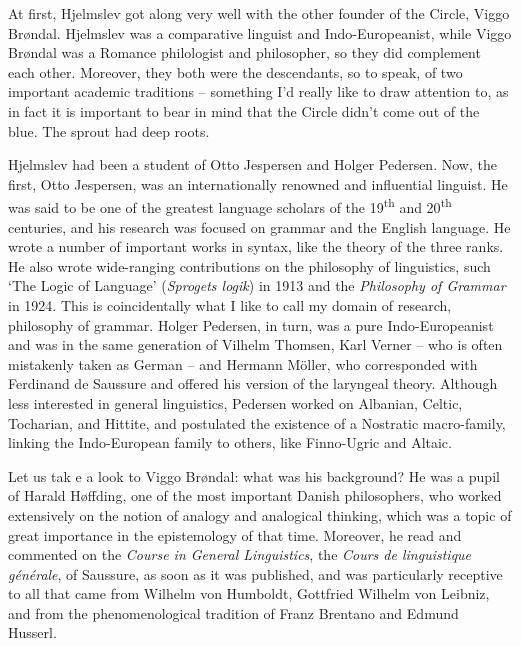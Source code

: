 \begin{styleStandard}
At first, Hjelmslev got along very well with the other founder of the Circle, Viggo Brøndal. Hjelmslev was a comparative linguist and Indo-Europeanist, while Viggo Brøndal was a Romance philologist and philosopher, so they did complement each other. Moreover, they both were the descendants, so to speak, of two important academic traditions – something I’d really like to draw attention to, as in fact it is important to bear in mind that the Circle didn’t come out of the blue. The sprout had deep roots. 
\end{styleStandard}

\begin{styleStandard}
Hjelmslev had been a student of Otto Jespersen and Holger Pedersen. Now, the first, Otto Jespersen, was an internationally renowned and influential linguist. He was said to be one of the greatest language scholars of the 19\textsuperscript{th} and 20\textsuperscript{th} centuries, and his research was focused on grammar and the English language. He wrote a number of important works in syntax, like the theory of the three ranks. He also wrote wide-ranging contributions on the philosophy of linguistics, such ‘The Logic of Language’ (\textit{Sprogets logik}) in 1913 and the \textit{Philosophy of Grammar} in 1924. This is coincidentally what I like to call my domain of research, philosophy of grammar. Holger Pedersen, in turn, was a pure Indo-Europeanist and was in the same generation of Vilhelm Thomsen, Karl Verner – who is often mistakenly taken as German – and Hermann Möller, who corresponded with Ferdinand de Saussure and offered his version of the laryngeal theory. Although less interested in general linguistics, Pedersen worked on Albanian, Celtic, Tocharian, and Hittite, and postulated the existence of a Nostratic macro-family, linking the Indo-European family to others, like Finno-Ugric and Altaic. 
\end{styleStandard}

\begin{styleStandard}
Let us tak e a look to Viggo Brøndal: what was his background? He was a pupil of Harald Høffding, one of the most important Danish philosophers, who worked extensively on the notion of analogy and analogical thinking, which was a topic of great importance in the epistemology of that time. Moreover, he read and commented on the \textit{Course in General Linguistics}, the \textit{Cours de linguistique générale}, of Saussure, as soon as it was published, and was particularly receptive to all that came from Wilhelm von Humboldt, Gottfried Wilhelm von Leibniz, and from the phenomenological tradition of Franz Brentano and Edmund Husserl. 
\end{styleStandard}

